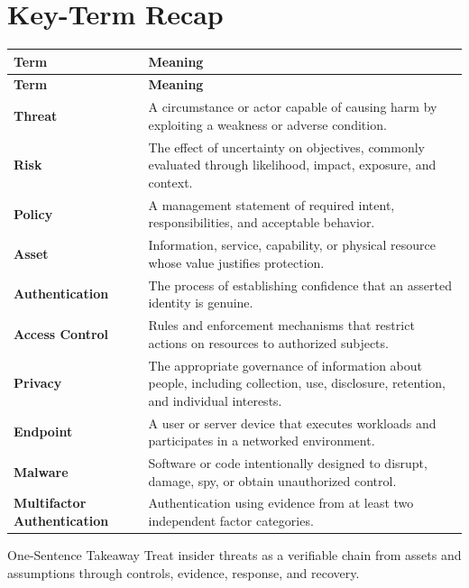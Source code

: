 \documentclass[11pt,letterpaper]{article}
\begin{document}
\section*{Key-Term Recap}
\begin{longtable}{>{\raggedright\arraybackslash}p{}>{\raggedright\arraybackslash}p{}}
\toprule\rowcolor{Navy}\color{white}\textbf{Term} & \color{white}\textbf{Meaning}\\\midrule
\endfirsthead
\toprule\rowcolor{Navy}\color{white}\textbf{Term} & \color{white}\textbf{Meaning}\\\midrule
\endhead
\textbf{Threat} & A circumstance or actor capable of causing harm by exploiting a weakness or adverse condition. \\\midrule
\textbf{Risk} & The effect of uncertainty on objectives, commonly evaluated through likelihood, impact, exposure, and context. \\\midrule
\textbf{Policy} & A management statement of required intent, responsibilities, and acceptable behavior. \\\midrule
\textbf{Asset} & Information, service, capability, or physical resource whose value justifies protection. \\\midrule
\textbf{Authentication} & The process of establishing confidence that an asserted identity is genuine. \\\midrule
\textbf{Access Control} & Rules and enforcement mechanisms that restrict actions on resources to authorized subjects. \\\midrule
\textbf{Privacy} & The appropriate governance of information about people, including collection, use, disclosure, retention, and individual interests. \\\midrule
\textbf{Endpoint} & A user or server device that executes workloads and participates in a networked environment. \\\midrule
\textbf{Malware} & Software or code intentionally designed to disrupt, damage, spy, or obtain unauthorized control. \\\midrule
\textbf{Multifactor Authentication} & Authentication using evidence from at least two independent factor categories. \\\midrule
\bottomrule
\end{longtable}
\begin{CornellExamBox}{One-Sentence Takeaway}
Treat insider threats as a verifiable chain from assets and assumptions through controls, evidence, response, and recovery.
\end{CornellExamBox}
\end{document}
